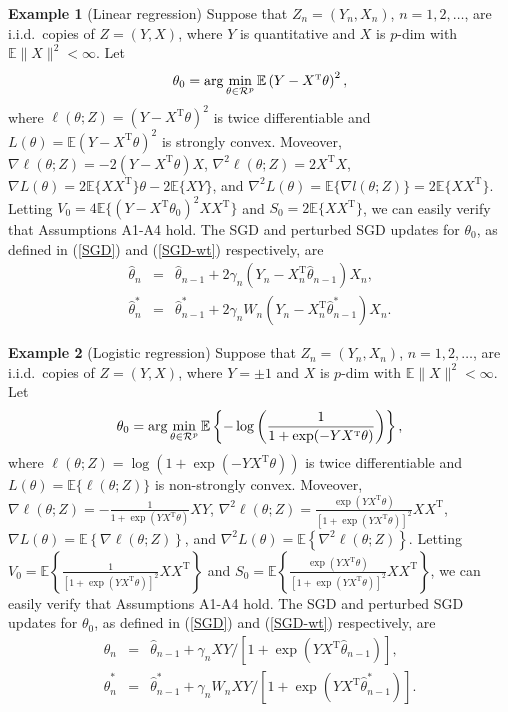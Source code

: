 \documentclass[twoside,11pt]{article}
\def\arg{\mathop{\rm arg}}
\def\trans{^{ \mathrm{\scriptscriptstyle T} }}
\def\wh{\widehat}
\begin{document}
{\bf Example 1} (Linear regression) Suppose that $Z_n=(Y_n, X_n)$, $n=1, 2, \dots$, are i.i.d.~copies of $Z=(Y, X)$, where $Y$ is quantitative and $X$ is $p$-dim with $\mathbb{E}\|X\|^2<\infty$. Let
\begin{eqnarray}\label{eg-lm}
\theta_0=\arg\min_{\theta\in\mathcal{R}^p}\mathbb{E}\left(Y-X\trans\theta\right)^2,
\end{eqnarray}
where $\ell(\theta; Z)=(Y-X\trans\theta)^2$ is twice differentiable and $L(\theta)=\mathbb{E}\left(Y-X\trans\theta\right)^2$ is strongly convex. Moveover, $\nabla \ell(\theta; Z)=-2(Y-X\trans\theta)X$, $\nabla^2 \ell(\theta; Z)=2X\trans X$, $\nabla L(\theta)=2\mathbb{E}\{XX\trans\}\theta-2\mathbb{E}\{XY\}$, and $\nabla^2 L(\theta)=\mathbb{E}\{\nabla l(\theta; Z)\}=2\mathbb{E}\{XX\trans\}$. Letting $V_0=4\mathbb{E}\{(Y-X\trans\theta_0)^2XX\trans\}$ and $S_0=2\mathbb{E}\{XX\trans\}$, we can easily verify that Assumptions A1-A4 hold. The SGD and perturbed SGD updates for $\theta_0$, as defined in (\ref{SGD}) and (\ref{SGD-wt}) respectively, are
\begin{eqnarray}
\wh{\theta}_n&=&\wh{\theta}_{n-1}+2\gamma_n(Y_n-X_n\trans\wh{\theta}_{n-1})X_n,\label{eg1-sgd}\\
\wh{\theta}^*_n&=&\wh{\theta}^*_{n-1}+2\gamma_nW_n(Y_n-X_n\trans\wh{\theta}^*_{n-1})X_n.\label{eg1-sgd-rw}
\end{eqnarray}


{\bf Example 2} (Logistic regression) Suppose that $Z_n=(Y_n, X_n)$, $n=1, 2, \dots$, are i.i.d.~copies of $Z=(Y, X)$, where $Y=\pm 1$ and $X$ is $p$-dim with $\mathbb{E}\|X\|^2<\infty$. Let
\begin{eqnarray}\label{eg-logit}
\theta_0=\arg\min_{\theta\in\mathcal{R}^p}\mathbb{E}\left\{-\log\left(\frac{1}{1+\exp(-YX\trans\theta)}\right)\right\},
\end{eqnarray}
where $\ell(\theta; Z)=\log\left(1+\exp(-YX\trans\theta)\right)$ is twice differentiable and $L(\theta)=\mathbb{E}\{\ell(\theta; Z)\}$ is non-strongly convex. Moveover, $\nabla \ell(\theta; Z)=-\frac{1}{1+\exp(YX\trans\theta)}XY$, $\nabla^2 \ell(\theta; Z)=\frac{\exp(YX\trans\theta)}{[1+\exp(YX\trans\theta)]^2}XX\trans$, $\nabla L(\theta)=\mathbb{E}\left\{\nabla \ell(\theta; Z)\right\}$, and $\nabla^2 L(\theta)=\mathbb{E}\left\{\nabla^2 \ell(\theta; Z)\right\}$. Letting $V_0=\mathbb{E}\left\{\frac{1}{[1+\exp(YX\trans\theta)]^2}XX\trans\right\}$ and $S_0=\mathbb{E}\left\{\frac{\exp(YX\trans\theta)}{[1+\exp(YX\trans\theta)]^2}XX\trans\right\}$, we can easily verify that Assumptions A1-A4 hold. The SGD and perturbed SGD updates for $\theta_0$, as defined in (\ref{SGD}) and (\ref{SGD-wt}) respectively, are
\begin{eqnarray}
\wh{\theta}_n&=&\wh{\theta}_{n-1}+\gamma_nXY/[1+\exp(YX\trans\wh{\theta}_{n-1})],\label{eg2-sgd}\\
\wh{\theta}^*_n&=&\wh{\theta}^*_{n-1}+\gamma_nW_nXY/[1+\exp(YX\trans\wh{\theta}^*_{n-1})].\label{eg2-sgd-rw}
\end{eqnarray}
\end{document}
